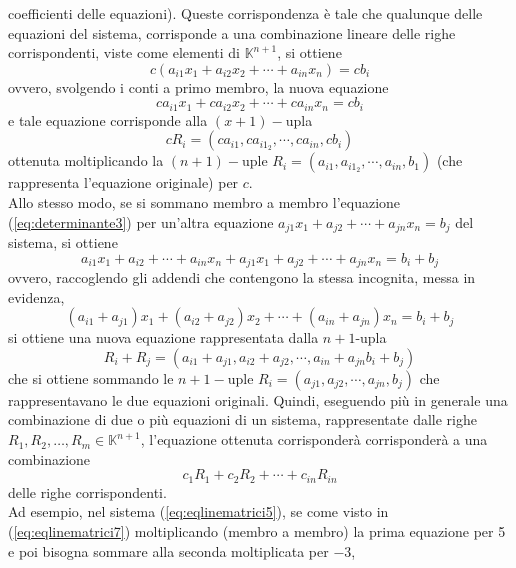 coefficienti delle equazioni). Queste corrispondenza è tale che qualunque
delle equazioni del sistema, corrisponde a una combinazione lineare delle
righe corrispondenti, viste come elementi di $\mathds{K}^{n+1}$, si
ottiene
\begin{equation*}
  c(a_{i1}x_1+a_{i2}x_2+\cdots+a_{in}x_n)=cb_{i}
\end{equation*}
ovvero, svolgendo i conti a primo membro, la nuova equazione
\begin{equation*}
  ca_{i1}x_1+ca_{i2}x_2+\cdots+ca_{in}x_n=cb_i
\end{equation*}
e tale equazione corrisponde alla $(x+1)-$upla
\begin{equation*}
  cR_i=(ca_{i1},ca_{i1_2},\cdots,ca_{in},cb_i)
\end{equation*}
ottenuta moltiplicando la $(n+1)-$uple
$R_i=(a_{i1},a_{i1_2},\cdots,a_{in},b_1)$ (che rappresenta l'equazione
originale) per $c$.\\
Allo stesso modo, se si sommano membro a membro l'equazione
(\ref{eq:determinante3}) per un'altra equazione
$a_{j1}x_1+a_{j2}+\cdots+a_{jn}x_{n}=b_j$ del sistema, si ottiene
\begin{equation*}
  a_{i1}x_1+a_{i2}+\cdots+a_{in}x_{n}+a_{j1}x_1+a_{j2}+\cdots+a_{jn}x_{n}
  =b_i+b_j
\end{equation*}
ovvero, raccoglendo gli addendi che contengono la stessa incognita, messa
in evidenza,
\begin{equation*}
  (a_{i1}+a_{j1})x_1+(a_{i2}+a_{j2})x_2+\cdots+(a_{in}+a_{jn})x_n=b_i+b_j
\end{equation*}
si ottiene una nuova equazione rappresentata dalla $n+1$-upla
\begin{equation*}
  R_i+R_j=(a_{i1}+a_{j1},a_{i2}+a_{j2},\cdots,a_{in}+a_{jn}b_i+b_j)
\end{equation*}
che si ottiene sommando le $n+1-$uple
$R_i=(a_{j1},a_{j2},\cdots,a_{jn},b_j)$ che rappresentavano le due
equazioni originali. Quindi, eseguendo più in generale una combinazione di
due o più equazioni di un sistema, rappresentate dalle righe
$R_1,R_2,\dots,R_m\in \mathds{K}^{n+1}$, l'equazione ottenuta
corrisponderà corrisponderà a una combinazione
\begin{equation*}
  c_1R_1+c_2R_2+\cdots+c_{in}R_{in}
\end{equation*}
delle righe corrispondenti.\\
Ad esempio, nel sistema (\ref{eq:eqlinematrici5}), se come visto in
(\ref{eq:eqlinematrici7}) moltiplicando (membro a membro) la prima
equazione per 5 e poi bisogna sommare alla seconda moltiplicata per $-3$,

